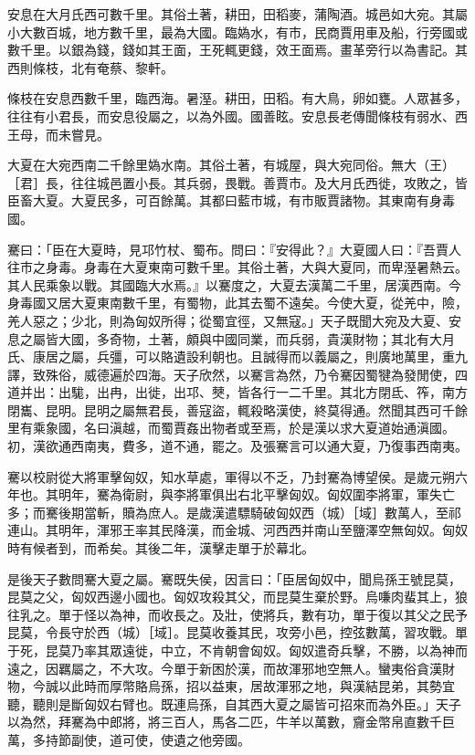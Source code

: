 \begin{pinyinscope}
安息在大月氏西可數千里。其俗土著，耕田，田稻麥，蒲陶酒。城邑如大宛。其屬小大數百城，地方數千里，最為大國。臨媯水，有市，民商賈用車及船，行旁國或數千里。以銀為錢，錢如其王面，王死輒更錢，效王面焉。畫革旁行以為書記。其西則條枝，北有奄蔡、黎軒。

條枝在安息西數千里，臨西海。暑溼。耕田，田稻。有大鳥，卵如甕。人眾甚多，往往有小君長，而安息役屬之，以為外國。國善眩。安息長老傳聞條枝有弱水、西王母，而未嘗見。

大夏在大宛西南二千餘里媯水南。其俗土著，有城屋，與大宛同俗。無大（王）［君］長，往往城邑置小長。其兵弱，畏戰。善賈市。及大月氏西徙，攻敗之，皆臣畜大夏。大夏民多，可百餘萬。其都曰藍市城，有市販賈諸物。其東南有身毒國。

騫曰：「臣在大夏時，見邛竹杖、蜀布。問曰：『安得此？』大夏國人曰：『吾賈人往市之身毒。身毒在大夏東南可數千里。其俗土著，大與大夏同，而卑溼暑熱云。其人民乘象以戰。其國臨大水焉。』以騫度之，大夏去漢萬二千里，居漢西南。今身毒國又居大夏東南數千里，有蜀物，此其去蜀不遠矣。今使大夏，從羌中，險，羌人惡之；少北，則為匈奴所得；從蜀宜徑，又無寇。」天子既聞大宛及大夏、安息之屬皆大國，多奇物，土著，頗與中國同業，而兵弱，貴漢財物；其北有大月氏、康居之屬，兵彊，可以賂遺設利朝也。且誠得而以義屬之，則廣地萬里，重九譯，致殊俗，威德遍於四海。天子欣然，以騫言為然，乃令騫因蜀犍為發閒使，四道并出：出駹，出冉，出徙，出邛、僰，皆各行一二千里。其北方閉氐、筰，南方閉巂、昆明。昆明之屬無君長，善寇盜，輒殺略漢使，終莫得通。然聞其西可千餘里有乘象國，名曰滇越，而蜀賈姦出物者或至焉，於是漢以求大夏道始通滇國。初，漢欲通西南夷，費多，道不通，罷之。及張騫言可以通大夏，乃復事西南夷。

騫以校尉從大將軍擊匈奴，知水草處，軍得以不乏，乃封騫為博望侯。是歲元朔六年也。其明年，騫為衛尉，與李將軍俱出右北平擊匈奴。匈奴圍李將軍，軍失亡多；而騫後期當斬，贖為庶人。是歲漢遣驃騎破匈奴西（城）［域］數萬人，至祁連山。其明年，渾邪王率其民降漢，而金城、河西西并南山至鹽澤空無匈奴。匈奴時有候者到，而希矣。其後二年，漢擊走單于於幕北。

是後天子數問騫大夏之屬。騫既失侯，因言曰：「臣居匈奴中，聞烏孫王號昆莫，昆莫之父，匈奴西邊小國也。匈奴攻殺其父，而昆莫生棄於野。烏嗛肉蜚其上，狼往乳之。單于怪以為神，而收長之。及壯，使將兵，數有功，單于復以其父之民予昆莫，令長守於西（城）［域］。昆莫收養其民，攻旁小邑，控弦數萬，習攻戰。單于死，昆莫乃率其眾遠徙，中立，不肯朝會匈奴。匈奴遣奇兵擊，不勝，以為神而遠之，因羈屬之，不大攻。今單于新困於漢，而故渾邪地空無人。蠻夷俗貪漢財物，今誠以此時而厚幣賂烏孫，招以益東，居故渾邪之地，與漢結昆弟，其勢宜聽，聽則是斷匈奴右臂也。既連烏孫，自其西大夏之屬皆可招來而為外臣。」天子以為然，拜騫為中郎將，將三百人，馬各二匹，牛羊以萬數，齎金幣帛直數千巨萬，多持節副使，道可使，使遺之他旁國。


\end{pinyinscope}

